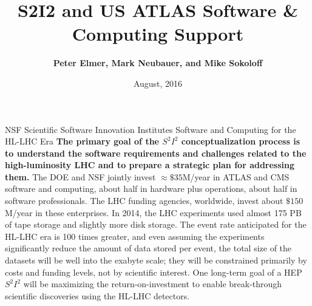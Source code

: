 \documentclass[compress,10]{beamer}
\title{S2I2 and US ATLAS Software \& Computing Support }
\author[Peter Elmer, Mark Neubauer, and Mike Sokoloff]
{
 \textcolor{LHCb dark}{\bf  Peter Elmer, Mark Neubauer, and Mike Sokoloff}
}
\date{August, 2016}
\begin{document}
\begin{frame}[noframenumbering]
	\titlepage
\end{frame}
\begin{frame}[fragile]{NSF Scientific Software Innovation Institutes}{
Software and Computing for the HL-LHC Era}
{\footnotesize
\textcolor{brickred}{\bf The primary goal of the $ S^2 I^2 $ conceptualization 
process is to understand
the software requirements and challenges related to
the high-luminosity LHC and to prepare a strategic plan for addressing them.}
The DOE and NSF jointly invest $ \approx \$ 35 $M/year in
ATLAS and CMS software and computing, about half in hardware plus operations,
about half in software professionals.
The LHC funding agencies, worldwide, invest about $ \$ 150 $M/year
in these enterprises.
In 2014, the LHC experiments used almost 175 PB of tape storage and
slightly more disk storage.
The event rate anticipated for the HL-LHC era is 100 times greater,
and even assuming the experiments significantly reduce the
amount of data stored per event,
the total size of the datasets will be well into the exabyte
scale;
they will be constrained primarily by costs and funding levels,
not by scientific interest.
One long-term goal of a HEP $ S^2 I^2 $
will be
maximizing the return-on-investment to enable break-through
scientific discoveries using the  HL-LHC detectors.
}  %
\end{frame}
\end{document}
